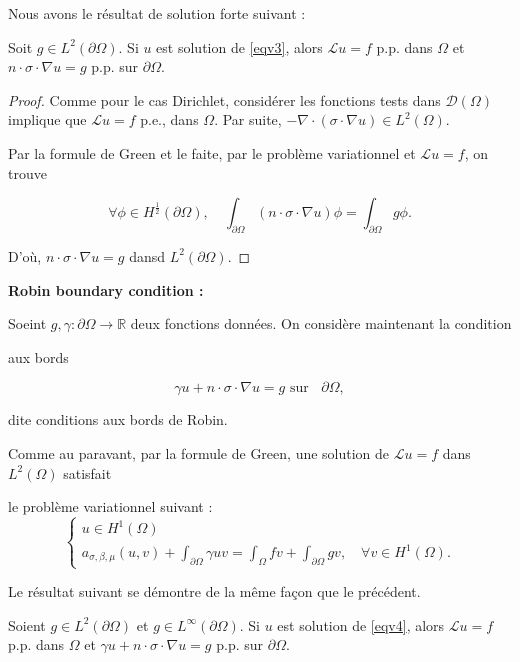 Nous avons le résultat de solution forte suivant :


\begin{proposition}
	Soit  $g \in L^{2}(\partial \Omega) .$ Si $u$ est solution de  \eqref{eqv3}, alors  $\mathcal{L} u=f$ p.p. dans  $\Omega$ et  $n \cdot \sigma \cdot \nabla u=g$ p.p. sur  $\partial \Omega$.
\end{proposition} 

\begin{proof}
Comme pour le cas Dirichlet,  considérer les fonctions tests dans  $\mathcal{D}(\Omega)$  implique que  $\mathcal{L} u=f$ p.e.,  dans  $\Omega$.
Par suite, $-\nabla \cdot(\sigma \cdot \nabla u) \in L^{2}(\Omega) .$

Par la formule de Green et le faite, par le problème variationnel et $\mathcal{L} u=f$, on trouve 

$$
\forall \phi \in H^{\frac12}(\partial \Omega), \quad\int_{\partial \Omega} (n \cdot \sigma \cdot \nabla u)\phi =\int_{\partial \Omega} g \phi.
$$

D'où, 
$n \cdot \sigma \cdot \nabla u=g$ dansd $L^{2}(\partial \Omega)$.  
\end{proof}



\textbf{Robin boundary condition :}

Soeint  $g, \gamma: \partial \Omega \rightarrow \mathbb{R}$ deux fonctions données.  On considère maintenant la condition 

aux bords  

$$\gamma u+n \cdot \sigma \cdot \nabla u=g    \text{ sur }\;\; \partial \Omega, 
$$ 

dite conditions aux bords de Robin. 

Comme au paravant, par la formule de Green, une solution de $\mathcal{L}u=f$ dans $L^2(\Omega)$ satisfait 

le problème variationnel suivant :
\begin{equation}\label{eqv4}
\left\{\begin{array}{l}
	 u \in H^{1}(\Omega) \\
	a_{\sigma, \beta, \mu}(u, v)+\int_{\partial \Omega} \gamma u v=\int_{\Omega} f v+\int_{\partial \Omega} g v, \quad \forall v \in H^{1}(\Omega).
\end{array}\right.
\end{equation}

Le résultat suivant se démontre de la même façon  que le précédent.


\begin{proposition}
	Soient  $g \in L^{2}(\partial \Omega) $ et $g \in L^{\infty}(\partial \Omega)$.  Si $u$ est solution de  \eqref{eqv4}, alors  $\mathcal{L} u=f$ p.p. dans  $\Omega$ et  $\gamma u+n \cdot \sigma \cdot \nabla u=g$ p.p. sur  $\partial \Omega$.
\end{proposition} 


